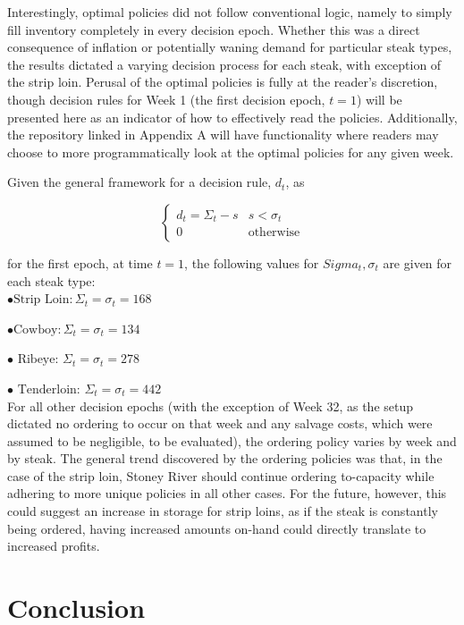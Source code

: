 \documentclass[12pt,a4paper]{article}
\begin{document}
Interestingly, optimal policies did not follow conventional logic, namely to simply fill inventory completely in every decision epoch. Whether this was a direct consequence of inflation or potentially waning demand for particular steak types, the results dictated a varying decision process for each steak, with exception of the strip loin. Perusal of the optimal policies is fully at the reader's discretion, though decision rules for Week 1 (the first decision epoch, $t = 1$) will be presented here as an indicator of how to effectively read the policies. Additionally, the repository linked in Appendix A will have functionality where readers may choose to more programmatically look at the optimal policies for any given week.

Given the general framework for a decision rule, $d_{t}$, as 

\begin{equation}
\begin{cases}
d_{t} = \Sigma_{t} - s & s < \sigma_{t} \\ 0 & \text{otherwise} 
\end{cases}
\end{equation}

for the first epoch, at time $t = 1$, the following values for $Sigma_{t}, \sigma_{t}$ are given for each steak type:
\\

$ \bullet \text{Strip Loin}: \Sigma_{t} = \sigma_{t} = 168$ 

$ \bullet \text{Cowboy}: \Sigma_{t} = \sigma_{t} = 134$

$ \bullet \text{ Ribeye: } \Sigma_{t} = \sigma_{t} = 278  $

$ \bullet \text{ Tenderloin: } \Sigma_{t} = \sigma_{t} = 442  $
\\

For all other decision epochs (with the exception of Week 32, as the setup dictated no ordering to occur on that week and any salvage costs, which were assumed to be negligible, to be evaluated), the ordering policy varies by week and by steak. The general trend discovered by the ordering policies was that, in the case of the strip loin, Stoney River should continue ordering to-capacity while adhering to more unique policies in all other cases. For the future, however, this could suggest an increase in storage for strip loins, as if the steak is constantly being ordered, having increased amounts on-hand could directly translate to increased profits.

\section{Conclusion}
\end{document}
